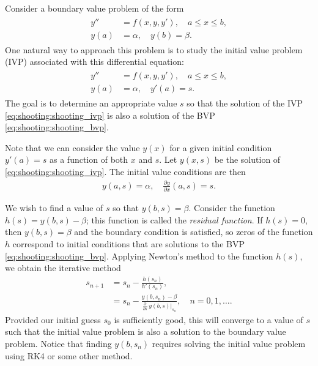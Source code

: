 \label{lab:Shooting}

Consider a boundary value problem of the form
\begin{align}
	\label{eq:shooting:shooting_bvp}
	\begin{split}
y'' &= f(x,y,y'), \quad a \leq x \leq b, \\
y(a) &= \alpha, \quad y(b) = \beta.
\end{split}
\end{align}
One natural way to approach this problem is to study the initial value problem (IVP) associated with this differential equation:
\begin{align}
	\label{eq:shooting:shooting_ivp}
	\begin{split}
y'' &= f(x,y,y'), \quad a \leq x \leq b, \\
y(a) &= \alpha, \quad y'(a) = s.
	\end{split}
\end{align}
The goal is to determine an appropriate value $s$ so that the solution of the IVP \ref{eq:shooting:shooting_ivp} is also a solution of the BVP \ref{eq:shooting:shooting_bvp}.

Note that we can consider the value \(y(x)\) for a given initial condition \(y'(a)=s\) as a function of both \(x\) and \(s\).
Let $y(x,s)$ be the solution of \eqref{eq:shooting:shooting_ivp}.
The initial value conditions are then
\begin{align}
y(a, s) = \alpha, \quad \frac{\partial y}{\partial x}(a, s) = s.
\end{align}

We wish to find a value of $s$ so that $y(b,s) = \beta$.
Consider the function \(h(s)=y(b,s)-\beta\); this function is called the \textit{residual function}.
If \(h(s)=0\), then \(y(b,s)=\beta\) and the boundary condition is satisfied, so zeros of the function \(h\) correspond to initial conditions that are solutions to the BVP \ref{eq:shooting:shooting_bvp}.
Applying Newton's method to the function $h(s)$, we obtain the iterative method
\begin{align*}
	s_{n+1} &= s_n - \frac{ h(s_n)}{h'(s_n) }, \\
	&= s_n - \frac{ y(b,s_n) - \beta}{\frac{\partial}{\partial s}\, y(b,s)\big|_{s_n} },\quad n = 0,1,\ldots .
\end{align*}
Provided our initial guess \(s_0\) is sufficiently good, this will converge to a value of \(s\) such that the initial value problem is also a solution to the boundary value problem.
Notice that finding $y(b,s_n)$ requires solving the initial value problem using RK4 or some other method.

